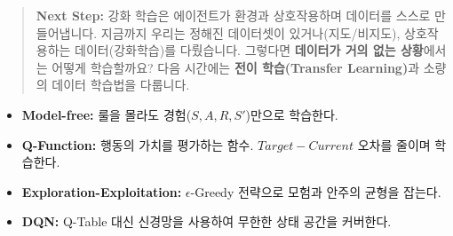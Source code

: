 \documentclass[11pt,a4paper]{book}
\theoremstyle{definition}
\begin{document}
\vspace{1cm}
\begin{quote}
\textbf{Next Step:} 강화 학습은 에이전트가 환경과 상호작용하며 데이터를 스스로 만들어냅니다. 지금까지 우리는 정해진 데이터셋이 있거나(지도/비지도), 상호작용하는 데이터(강화학습)를 다뤘습니다. 그렇다면 \textbf{데이터가 거의 없는 상황}에서는 어떻게 학습할까요? 다음 시간에는 \textbf{전이 학습(Transfer Learning)}과 소량의 데이터 학습법을 다룹니다.
\end{quote}

\begin{summarybox}[title={Unit 5 (Part B) 핵심 요약}]
\begin{itemize}
    \item \textbf{Model-free:} 룰을 몰라도 경험($S, A, R, S'$)만으로 학습한다.
    \item \textbf{Q-Function:} 행동의 가치를 평가하는 함수. $Target - Current$ 오차를 줄이며 학습한다.
    \item \textbf{Exploration-Exploitation:} $\epsilon$-Greedy 전략으로 모험과 안주의 균형을 잡는다.
    \item \textbf{DQN:} Q-Table 대신 신경망을 사용하여 무한한 상태 공간을 커버한다.
\end{itemize}
\end{summarybox}
\end{document}
